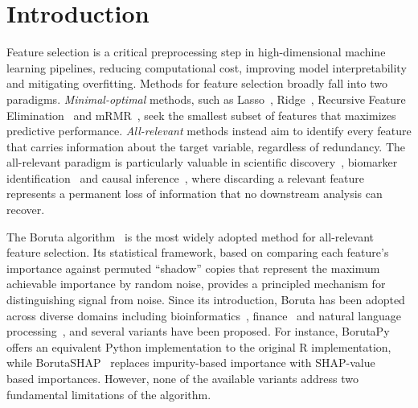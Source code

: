 \documentclass[runningheads]{llncs}
\begin{document}
\section{Introduction}
\label{sec:introduction}

Feature selection is a critical preprocessing step in high-dimensional machine learning pipelines, reducing computational cost, improving model interpretability and mitigating overfitting. Methods for feature selection broadly fall into two paradigms. \emph{Minimal-optimal} methods, such as Lasso~\cite{tibshirani1996lasso}, Ridge~\cite{hoerl1970ridge}, Recursive Feature Elimination~\cite{guyon2002rfe} and mRMR~\cite{peng2005mrmr}, seek the smallest subset of features that maximizes predictive performance. \emph{All-relevant} methods instead aim to identify every feature that carries information about the target variable, regardless of redundancy. The all-relevant paradigm is particularly valuable in scientific discovery~\cite{rak2019evaluation}, biomarker identification~\cite{mardian2023ovarian} and causal inference~\cite{pellet2008markov}, where discarding a relevant feature represents a permanent loss of information that no downstream analysis can recover.

The Boruta algorithm~\cite{kursa2010feature,kursa2010boruta} is the most widely adopted method for all-relevant feature selection. Its statistical framework, based on comparing each feature's importance against permuted ``shadow'' copies that represent the maximum achievable importance by random noise, provides a principled mechanism for distinguishing signal from noise. Since its introduction, Boruta has been adopted across diverse domains including bioinformatics~\cite{rak2019evaluation,mardian2023ovarian}, finance~\cite{pinto2024forecasting,li2024stock} and natural language processing~\cite{sallah2024fake,tan2024mosquito}, and several variants have been proposed. For instance, BorutaPy~\cite{borutapy} offers an equivalent Python implementation to the original R implementation, while BorutaSHAP~\cite{borutashap} replaces impurity-based importance with SHAP-value~\cite{lundberg2017shap} based importances. However, none of the available variants address two fundamental limitations of the algorithm. 
\end{document}

